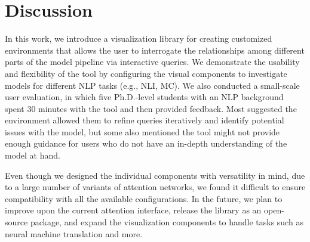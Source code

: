 \section{Discussion}
In this work, we introduce a visualization library for creating customized environments that allows the user to interrogate the relationships among different parts of the model pipeline via interactive queries.
%
We demonstrate the usability and flexibility of the tool by configuring the visual components to investigate models for different NLP tasks (e.g., NLI, MC).
%
We also conducted a small-scale user evaluation, in which five Ph.D.-level students with an NLP background spent 30 minutes with the tool and then provided feedback. Most suggested the environment allowed them to refine queries iteratively and identify potential issues with the model, but some also mentioned the tool might not provide enough guidance for users who do not have an in-depth understanding of the model at hand.

Even though we designed the individual components with versatility in mind, due to a large number of variants of attention networks, we found it difficult to ensure compatibility with all the available configurations.
%
In the future, we plan to improve upon the current attention interface, release the library as an open-source package, and expand the visualization components to handle tasks such as neural machine translation and more.
